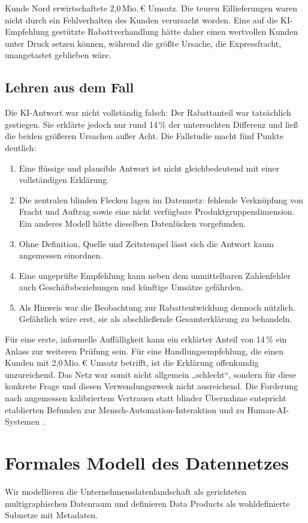 \documentclass[a4paper,12pt,twoside]{report}
\theoremstyle{definition}
\begin{document}
Kunde Nord erwirtschaftete 2{,}0\,Mio.\,€ Umsatz. Die teuren Eillieferungen waren nicht durch ein Fehlverhalten des Kunden verursacht worden. Eine auf die KI-Empfehlung gestützte Rabattverhandlung hätte daher einen wertvollen Kunden unter Druck setzen können, während die größte Ursache, die Expressfracht, unangetastet geblieben wäre.

\section{Lehren aus dem Fall}
Die KI-Antwort war nicht vollständig falsch: Der Rabattanteil war tatsächlich gestiegen. Sie erklärte jedoch nur rund 14\,\% der untersuchten Differenz und ließ die beiden größeren Ursachen außer Acht. Die Fallstudie macht fünf Punkte deutlich:
\begin{enumerate}
\item Eine flüssige und plausible Antwort ist nicht gleichbedeutend mit einer vollständigen Erklärung.
\item Die zentralen blinden Flecken lagen im Datennetz: fehlende Verknüpfung von Fracht und Auftrag sowie eine nicht verfügbare Produktgruppendimension. Ein anderes Modell hätte dieselben Datenlücken vorgefunden.
\item Ohne Definition, Quelle und Zeitstempel lässt sich die Antwort kaum angemessen einordnen.
\item Eine ungeprüfte Empfehlung kann neben dem unmittelbaren Zahlenfehler auch Geschäftsbeziehungen und künftige Umsätze gefährden.
\item Als Hinweis war die Beobachtung zur Rabattentwicklung dennoch nützlich. Gefährlich wäre erst, sie als abschließende Gesamterklärung zu behandeln.
\end{enumerate}
Für eine erste, informelle Auffälligkeit kann ein erklärter Anteil von 14\,\% ein Anlass zur weiteren Prüfung sein. Für eine Handlungsempfehlung, die einen Kunden mit 2{,}0\,Mio.\,€ Umsatz betrifft, ist die Erklärung offenkundig unzureichend. Das Netz war somit nicht allgemein „schlecht“, sondern für diese konkrete Frage und diesen Verwendungszweck nicht ausreichend.
Die Forderung nach angemessen kalibriertem Vertrauen statt blinder Übernahme entspricht etablierten Befunden zur Mensch-Automation-Interaktion und zu Human-AI-Systemen \cite{leesee04,parasuraman97,amershi19}.

\chapter{Formales Modell des Datennetzes}\label{sec:formal}
Wir modellieren die Unternehmensdatenlandschaft als gerichteten multigraphischen Datenraum und definieren Data Products als wohldefinierte Subnetze mit Metadaten.
\end{document}
